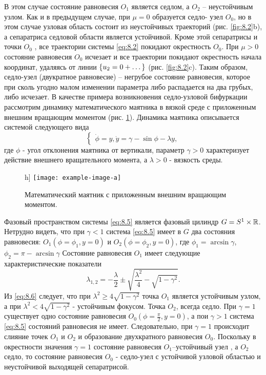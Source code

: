В этом случае состояние равновесия $O_1$ является седлом, а $O_2$ --
неустойчивым узлом. Как и в предыдущем случае, при $\mu=0$ образуется седло-
узел $O_0$, но в этом случае узловая область состоит из неустойчивых траекторий
(рис. \ref{fig:8.2}b), а сепаратриса седловой области является устойчивой. Кроме этой
сепаратрисы и точки $O_0$ , все траектории системы \eqref{eq:8.2} покидают окрестность
$O_0$. При $\mu>0$ состояние равновесия $O_0$ исчезает и все траектории покидают
окрестность начала координат, удаляясь от линии $\qty{u_2=0+\dots}$ (рис. \ref{fig:8.2}c).
Таким образом, седло-узел (двукратное равновесие) -- негрубое состояние
равновесия, которое при сколь угодно малом изменении параметра либо
распадается на два грубых, либо исчезает.
В качестве примера возникновения седло-узловой бифуркации
рассмотрим динамику математического маятника в вязкой среде с
приложенным внешним вращающим моментом (рис. \ref{fig:8.3}). Динамика маятника
описывается системой следующего вида
\begin{equation}
        \label{eq:8.5}
        \begin{cases}
                \dot \phi =y,
               \dot y = \gamma - \sin \phi - \lambda y, 
        \end{cases}
\end{equation}
где $\phi$ - угол отклонения маятника от вертикали, параметр $\gamma>0$ 
характеризует действие внешнего вращательного момента, а $\lambda>0$
- вязкость среды.
 \begin{figure}h]
        \centering
        \texttt{[image: example-image-a]}
        \caption{Математический маятник с приложенным внешним вращающим моментом.}
        \label{fig:8.3}
\end{figure}
Фазовый пространством системы \eqref{eq:8.5} является фазовый цилиндр $G= S^1 \times \mathbb{R}$.
Нетрудно видеть, что при $\gamma<1$ система \eqref{eq:8.5} имеет в $G$ два состояния равновесия:
$O_1(\phi=\phi_1, y=0)$ и $O_2(\phi=\phi_2, y=0)$, где $\phi_1= \arcsin \gamma$,
$\phi_2 = \pi - \arcsin \gamma$
Состояние равновесия $O_1$ имеет следующие характеристические показатели
\begin{equation}
        \label{eq:8.6}
        \lambda_{1,2} = - \frac{\lambda}{2} \pm \sqrt{ \frac{\lambda^2}{4} - \sqrt{1-\gamma^2} }.
\end{equation}
Из \eqref{eq:8.6} следует, что при $\lambda^2 \geq 4 \sqrt{1-\gamma^2}$ точка $O_1$ является устойчивым узлом, а при 
$\lambda^2 < 4 \sqrt{1-\gamma^2}$ - устойчивым фокусом. Точка $O_2$, всегда седло.
При $\gamma=1$ существует одно состояние равновесия $O_0(\phi= \frac{\pi}{2}, y=0)$, а пои $\gamma>1$ система \eqref{eq:8.5} состояний равновесия не имеет. Следовательно, при $\gamma=1$ 
происходит слияние точек $O_1$ и $O_2$ и образование двухкратного равновесия $O_0$.
Поскольку в окрестности значения $\gamma=1$ состояние равновесия $O_1$--устойчивый узел
, а $O_2$ седло, то состояние равновесия $O_0$ - седло-узел с устойчивой узловой областью 
и неустойчивой выходящей сепаратрисой.

